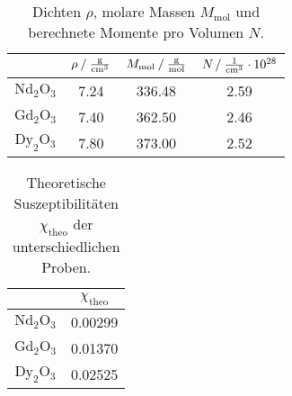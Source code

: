 \begin{table}[H]
    \centering
    \caption{Dichten $\rho$, molare Massen $M_\text{mol}$ und berechnete Momente pro Volumen $N$.}
    \label{tab:probwertis}
    \begin{tabular}{S S[table-format=1.2] S[table-format=3.2] S[table-format=1.2]}
      \toprule
      {} & {$\rho \mathbin{/} \unit{\frac{\gram}{{\centi\meter}^3}}$} & {$M_\text{mol} \mathbin{/} \unit{\frac{\gram}{\mol}}$} & {$N \mathbin{/} \unit{\frac{1}{{\centi\meter}^3}} \cdot 10^{28}$}  \\
      \midrule
      {$\text{Nd}_2 \text{O}_3$}        &           7.24          &         336.48          &           2.59            \\
      {$\text{Gd}_2\text{O}_3$}         &           7.40          &         362.50          &           2.46            \\
      {$\text{Dy}_2\text{O}_3$}         &           7.80          &         373.00          &           2.52            \\
      \bottomrule
    \end{tabular}
\end{table}

\begin{table}[H]
    \centering
    \caption{Theoretische Suszeptibilitäten $\chi_\text{theo}$ der unterschiedlichen Proben.}
    \label{tab:theosus}
    \begin{tabular}{S S[table-format = 1.6]}
      \toprule
      {} & {$\chi_\text{theo}$}  \\
      \midrule
      {$\text{Nd}_2 \text{O}_3$}        &           0.00299         \\
      {$\text{Gd}_2\text{O}_3$}         &           0.01370         \\
      {$\text{Dy}_2\text{O}_3$}         &           0.02525         \\
      \bottomrule
    \end{tabular}
\end{table}